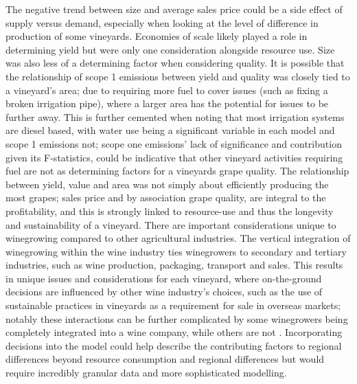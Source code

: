 \documentclass[review,12pt,authoryear]{elsarticle}
\begin{document}
\begin{linenumbers}
\newline
The negative trend between size and average sales price could be a side effect of supply versus demand, especially when looking at the level of difference in production of some vineyards. Economies of scale likely played a role in determining yield but were only one consideration alongside resource use. Size was also less of a determining factor when considering quality. It is possible that the relationship of scope 1 emissions between yield and quality was closely tied to a vineyard's area; due to requiring more fuel to cover issues (such as fixing a broken irrigation pipe), where  a larger area has the potential for issues to be further away. This is further cemented when noting that most irrigation systems are diesel based, with water use being a significant variable in each model and scope 1 emissions not; scope one emissions' lack of significance and contribution given its F-statistics, could be indicative that other vineyard activities requiring fuel are not as determining factors for a vineyards grape quality. The relationship between yield, value and area was not simply about efficiently producing the most grapes; sales price and by association grape quality, are integral to the profitability, and this is strongly linked to resource-use and thus the longevity and sustainability of a vineyard.
\newline
There are important considerations unique to winegrowing compared to other agricultural industries. The vertical integration of winegrowing within the wine industry ties winegrowers to secondary and tertiary industries, such as wine production, packaging, transport and sales. This results in unique issues and considerations for each vineyard, where on-the-ground decisions are influenced by other wine industry's choices, such as the use of sustainable practices in vineyards as a requirement for sale in overseas markets; notably these interactions can be further complicated by some winegrowers being completely integrated into a wine company, while others are not \citep{knightFirmResourcesDevelopment2019}. Incorporating decisions into the model could help describe the contributing factors to regional differences beyond resource consumption and regional differences but would require incredibly granular data and more sophisticated modelling.

\end{linenumbers}
\end{document}
